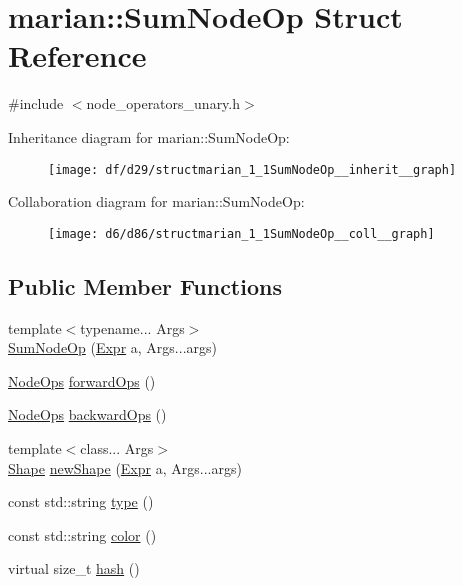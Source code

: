 \hypertarget{structmarian_1_1SumNodeOp}{}\section{marian\+:\+:Sum\+Node\+Op Struct Reference}
\label{structmarian_1_1SumNodeOp}


{\ttfamily \#include $<$node\+\_\+operators\+\_\+unary.\+h$>$}



Inheritance diagram for marian\+:\+:Sum\+Node\+Op\+:
\nopagebreak
\begin{figure}[H]
\begin{center}
\leavevmode
\texttt{[image: df/d29/structmarian\_1\_1SumNodeOp\_\_inherit\_\_graph]}
\end{center}
\end{figure}


Collaboration diagram for marian\+:\+:Sum\+Node\+Op\+:
\nopagebreak
\begin{figure}[H]
\begin{center}
\leavevmode
\texttt{[image: d6/d86/structmarian\_1\_1SumNodeOp\_\_coll\_\_graph]}
\end{center}
\end{figure}
\subsection*{Public Member Functions}
\begin{DoxyCompactItemize}
\item 
{\footnotesize template$<$typename... Args$>$ }\\\hyperlink{structmarian_1_1SumNodeOp_aa9ae98f12fcf38f3026c9cb19a168b08}{Sum\+Node\+Op} (\hyperlink{namespacemarian_a498d8baf75b754011078b890b39c8e12}{Expr} a, Args...\+args)
\item 
\hyperlink{namespacemarian_a4956376218cc236016c20bc4071470da}{Node\+Ops} \hyperlink{structmarian_1_1SumNodeOp_aefc02387c6ddad9a5825e204a511d9be}{forward\+Ops} ()
\item 
\hyperlink{namespacemarian_a4956376218cc236016c20bc4071470da}{Node\+Ops} \hyperlink{structmarian_1_1SumNodeOp_a705a3304de7f9aad90b7ead6736a8e46}{backward\+Ops} ()
\item 
{\footnotesize template$<$class... Args$>$ }\\\hyperlink{structmarian_1_1Shape}{Shape} \hyperlink{structmarian_1_1SumNodeOp_a217ee895f48f464dbe0ce55c685b927a}{new\+Shape} (\hyperlink{namespacemarian_a498d8baf75b754011078b890b39c8e12}{Expr} a, Args...\+args)
\item 
const std\+::string \hyperlink{structmarian_1_1SumNodeOp_aefe4aa2ebd3ff63972c8550bfc9d4fb4}{type} ()
\item 
const std\+::string \hyperlink{structmarian_1_1SumNodeOp_ae2985b156380c467fa272cc38233074a}{color} ()
\item 
virtual size\+\_\+t \hyperlink{structmarian_1_1SumNodeOp_ab58aedc0c1c6929f45e7fc7a4ad3ab17}{hash} ()
\end{DoxyCompactItemize}
